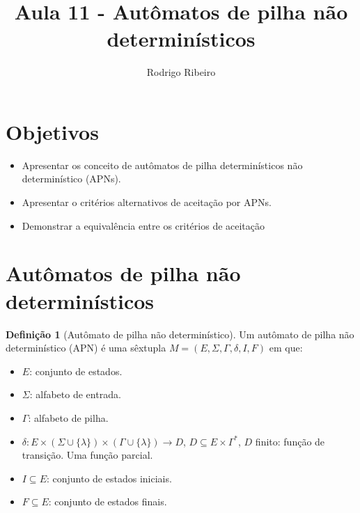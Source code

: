 \documentclass[a4paper]{article}
\theoremstyle{definition}
\newtheorem{Definition}{Definição}
\begin{document}
  \title{Aula 11 - Autômatos de pilha não determinísticos}
  \author{Rodrigo Ribeiro}

  \maketitle


  \pagestyle{fancy}


  \section*{Objetivos}

  \begin{itemize}
     \item Apresentar os conceito de autômatos de pilha determinísticos não
       determinístico (APNs).
     \item Apresentar o critérios alternativos de aceitação por APNs.
     \item Demonstrar a equivalência entre os critérios de aceitação
  \end{itemize}


  \section{Autômatos de pilha não determinísticos}

  \begin{Definition}[Autômato de pilha não determinístico]
    Um autômato de pilha não determinístico (APN) é uma sêxtupla
    $M=(E,\Sigma,\Gamma,\delta,I,F)$ em que:
    \begin{itemize}
       \item $E$: conjunto de estados.
       \item $\Sigma$: alfabeto de entrada.
       \item $\Gamma$: alfabeto de pilha.
       \item $\delta : E \times (\Sigma \cup \{\lambda\}) \times (\Gamma \cup
    \{\lambda\}) \to D$, $D\subseteq E \times \Gamma^*$, $D$ finito: função de transição. Uma função parcial.
       \item $I \subseteq E$: conjunto de estados iniciais.
       \item $F\subseteq E$: conjunto de estados finais.
    \end{itemize}
  \end{Definition}
 
\end{document}
